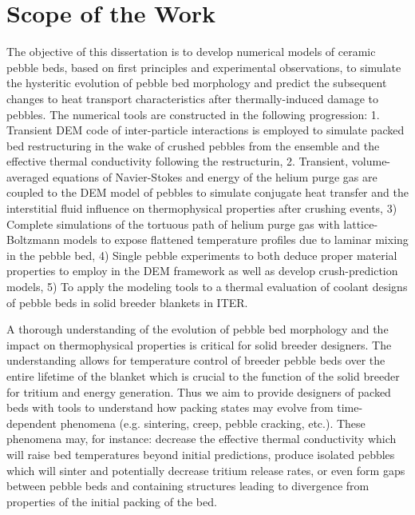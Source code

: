 \section{Scope of the Work}\label{sec:intro-scope-of-work}
The objective of this dissertation is to develop numerical models of ceramic pebble beds, based on first principles and experimental observations, to simulate the hysteritic evolution of pebble bed morphology and predict the subsequent changes to heat transport characteristics after thermally-induced damage to pebbles. The numerical tools are constructed in the following progression: 1. Transient DEM code of inter-particle interactions is employed to simulate packed bed restructuring in the wake of crushed pebbles from the ensemble and the effective thermal conductivity following the restructurin, 2. Transient, volume-averaged equations of Navier-Stokes and energy of the helium purge gas are coupled to the DEM model of pebbles to simulate conjugate heat transfer and the interstitial fluid influence on thermophysical properties after crushing events, 3) Complete simulations of the tortuous path of helium purge gas with lattice-Boltzmann models to expose flattened temperature profiles due to laminar mixing in the pebble bed, 4) Single pebble experiments to both deduce proper material properties to employ in the DEM framework as well as develop crush-prediction models, 5) To apply the modeling tools to a thermal evaluation of coolant designs of pebble beds in solid breeder blankets in ITER. 

A thorough understanding of the evolution of pebble bed morphology and the impact on thermophysical properties is critical for solid breeder designers. The understanding allows for temperature control of breeder pebble beds over the entire lifetime of the blanket which is crucial to the function of the solid breeder for tritium and energy generation. Thus we aim to provide designers of packed beds with tools to understand how packing states may evolve from time-dependent phenomena (e.g. sintering, creep, pebble cracking, etc.). These phenomena may, for instance: decrease the effective thermal conductivity which will raise bed temperatures beyond initial predictions, produce isolated pebbles which will sinter and potentially decrease tritium release rates, or even form gaps between pebble beds and containing structures leading to divergence from properties of the initial packing of the bed.

